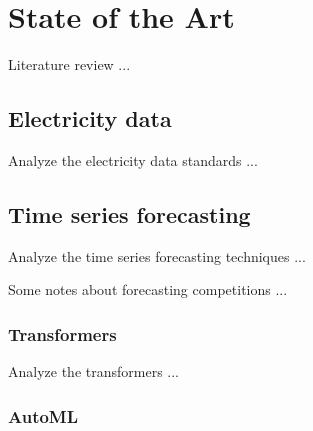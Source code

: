 \chapter{State of the Art}
\label{cha:soa}
\vspace{0.4 cm}

Literature review ...


\section{Electricity data}
\label{sec:data}
\vspace{0.2 cm}

Analyze the electricity data standards ...
\cite{CHEN201798}
\cite{8577770}
\cite{8284772}
\cite{5772503}


\section{Time series forecasting}
\label{sec:timeseries}
\vspace{0.2 cm}

Analyze the time series forecasting techniques ...
\cite{DEGOOIJER2006443}
\cite{SMYL202075}
\cite{Lim2021}
\cite{ZHANG2003159}
\cite{Nesreen2010}
\cite{SEZER2020106181}
\cite{en16031371}
\cite{HEWAMALAGE2021388}
\cite{BENTAIEB20127067}
\cite{CAO2003321}
\cite{LI2019104785}
\cite{DU2020269}
\cite{Sean2017}
\cite{Masini2023}
\cite{Borovykh2017}
\cite{SHEN2020302}
\cite{DEOSANTOSJUNIOR201972}
\cite{Athiyarath2020}
\cite{Cerqueira2020}
\cite{6210391}
\cite{TEALAB2018334}
\cite{Oliveira2015}
\cite{BERGMEIR2012192}

Some notes about forecasting competitions ...
\cite{HYNDMAN20207}
\cite{SPILIOTIS202037}


\vspace{0.1 cm}
\subsection{Transformers}
\label{sec:transformers}
\vspace{0.1 cm}

Analyze the transformers ...
\cite{Grigsby2021}
\cite{Wu2020}
\cite{Zhou2020}
\cite{Vaswani2017}
\cite{NIU202148}
\cite{LIM20211748}
\cite{LIU2020113082}
\cite{Shih2019}
\cite{WU2022123990}
\cite{ZHANG2022329}
\cite{9745215}
\cite{10019616}
\cite{9676694}
\cite{9892274}
\cite{9586824}
\cite{9688968}
\cite{HEIDARI2020626}

\vspace{0.1 cm}
\subsection{AutoML}
\label{sec:automl}
\vspace{0.1 cm}


